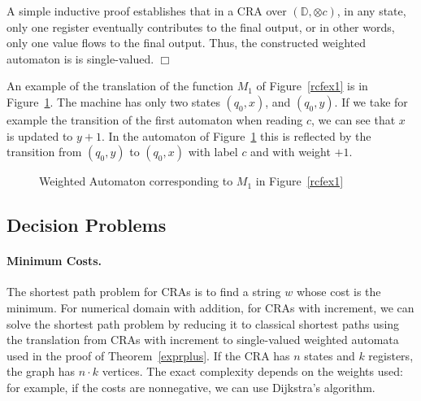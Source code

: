 \documentclass[11pt]{article}
\def\qed{{\bf $\Box$}}
\newcommand{\mypar}[1]{\subsection{#1}}
\def\qed{{\bf $\Box$}}
\newcommand{\domain}{\ensuremath{\mathbb{D}}}
\newcommand{\EDWA}{{CRA}\xspace}
\def\myplus{\otimes}
\begin{document}
A simple inductive proof establishes that in a \EDWA over
$(\domain,\myplus c)$, in any state, only one register eventually
contributes to the final output, or in other words, only one value
flows to the final output. Thus, the constructed weighted automaton is
is single-valued.
\qed

An example of the translation of the function $M_1$ of
Figure~\ref{rcfex1} is in Figure~\ref{wam1}. The machine has only two
states $(q_0,x)$, and $(q_0,y)$. If we take for example the transition
of the first automaton when reading $c$, we can see that $x$ is
updated to $y+1$. In the automaton of Figure~\ref{wam1} this is
reflected by the transition from $(q_0,y)$ to $(q_0,x)$ with label $c$
and with weight $+1$.


\begin{figure}[t]
\centering
{}
\caption{Weighted Automaton corresponding to $M_1$ in Figure~\ref{rcfex1}\label{wam1}}
\end{figure}


\mypar{Decision Problems}
\paragraph{Minimum Costs.}
The shortest path problem for CRAs is to
find a string $w$ whose cost is the minimum.
For numerical domain with addition, for CRAs with increment, we can solve the shortest path problem by reducing
it to classical shortest paths using the translation from CRAs with increment to single-valued weighted automata
used in the proof of Theorem~\ref{exprplus}.
If the CRA has $n$ states and $k$ registers, the graph has $n\cdot k$ vertices.
The exact complexity depends on the weights used: for example, if
the costs are nonnegative, we can use Dijkstra's algorithm.
\end{document}

